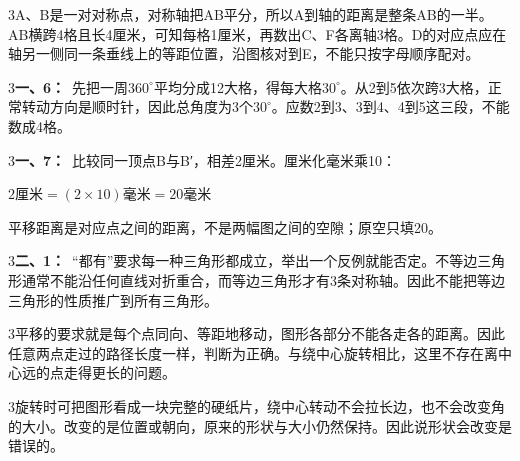 \documentclass[multi=snippet,border={5bp 20bp 5bp 5bp}]{standalone}
\newenvironment{snippet}[3]{\begin{minipage}{#1bp}\color{answerred}\fontsize{#2}{#3}\selectfont\raggedright}{\end{minipage}}
\begin{document}
\begin{snippet}{505}{11.5}{14}\begin{multicols}{3}\raggedcolumns A、B是一对对称点，对称轴把AB平分，所以A到轴的距离是整条AB的一半。AB横跨4格且长4厘米，可知每格1厘米，再数出C、F各离轴3格。D的对应点应在轴另一侧同一条垂线上的等距位置，沿图核对到E，不能只按字母顺序配对。\end{multicols}\end{snippet}
\begin{snippet}{505}{11.5}{14}\begin{multicols}{3}\raggedcolumns \textbf{一、6：}\ 先把一周\(360^\circ\)\allowbreak 平均分成12大格，得每大格\(30^\circ\)\allowbreak 。从2到5依次跨3大格，正常转动方向是顺时针，因此总角度为3个\(30^\circ\)\allowbreak 。应数2到3、3到4、4到5这三段，不能数成4格。\end{multicols}\end{snippet}
\begin{snippet}{505}{11.5}{14}\begin{multicols}{3}\raggedcolumns \textbf{一、7：}\ 比较同一顶点B与B′，相差2厘米。厘米化毫米乘10：\par\noindent\(\displaystyle 2\text{厘米}=(2\times10)\text{毫米}=20\text{毫米}\)\allowbreak \par 平移距离是对应点之间的距离，不是两幅图之间的空隙；原空只填20。\end{multicols}\end{snippet}
\begin{snippet}{505}{11.5}{14}\begin{multicols}{3}\raggedcolumns \textbf{二、1：}\ “都有”要求每一种三角形都成立，举出一个反例就能否定。不等边三角形通常不能沿任何直线对折重合，而等边三角形才有3条对称轴。因此不能把等边三角形的性质推广到所有三角形。\end{multicols}\end{snippet}
\begin{snippet}{505}{11.5}{14}\begin{multicols}{3}\raggedcolumns 平移的要求就是每个点同向、等距地移动，图形各部分不能各走各的距离。因此任意两点走过的路径长度一样，判断为正确。与绕中心旋转相比，这里不存在离中心远的点走得更长的问题。\end{multicols}\end{snippet}
\begin{snippet}{505}{11.5}{14}\begin{multicols}{3}\raggedcolumns 旋转时可把图形看成一块完整的硬纸片，绕中心转动不会拉长边，也不会改变角的大小。改变的是位置或朝向，原来的形状与大小仍然保持。因此说形状会改变是错误的。\end{multicols}\end{snippet}
\end{document}
